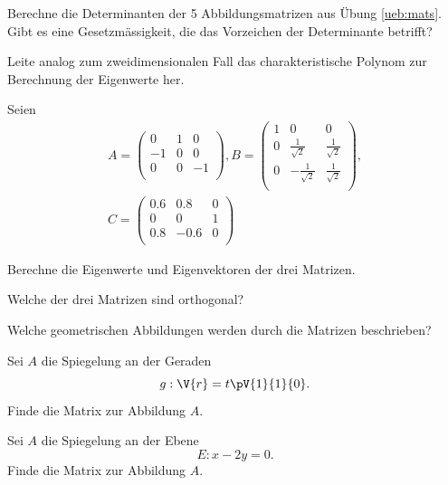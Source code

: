 \documentclass[%
11pt,%
twoside,%
titlepage,%
german,%
headsepline%
]{scrartcl}
\begin{document}
\begin{ueb}
Berechne
die Determinanten der 5 Abbildungsmatrizen aus Übung \ref{ueb:mats}. Gibt es eine Gesetzmässigkeit, die das Vorzeichen der Determinante betrifft?
\end{ueb}

\begin{ueb}
Leite analog zum zweidimensionalen Fall das charakteristische Polynom zur Berechnung der Eigenwerte her.
\end{ueb}

\begin{ueb}
Seien
\begin{gather*}
A=
\begin{pmatrix}
0&1&0\\
-1&0&0\\
0&0&-1\\
\end{pmatrix}
, B=
\begin{pmatrix}
1&0&0\\
0&\frac{1}{\sqrt{2}}&\frac{1}{\sqrt{2}}\\
0&-\frac{1}{\sqrt{2}}&\frac{1}{\sqrt{2}}\\
\end{pmatrix},
\\[2ex]
C=
\begin{pmatrix}
0.6&0.8&0\\
0&0&1\\
0.8&-0.6&0\\
\end{pmatrix}
\end{gather*}

\begin{enumeratea}
\item Berechne die Eigenwerte und Eigenvektoren der drei Matrizen.
\item Welche der drei Matrizen sind orthogonal?
\item Welche geometrischen Abbildungen werden durch die Matrizen beschrieben?
\end{enumeratea}
\end{ueb}

\begin{ueb}
Sei $A$ die Spiegelung an der Geraden
$$g:\V{r}=t\pV{1}{1}{0}.$$
Finde die Matrix zur Abbildung $A$.
\end{ueb}

\begin{ueb}
Sei $A$ die Spiegelung an der Ebene
$$E:x-2y=0.$$
Finde die Matrix zur Abbildung $A$.
\end{ueb}
\end{document}
